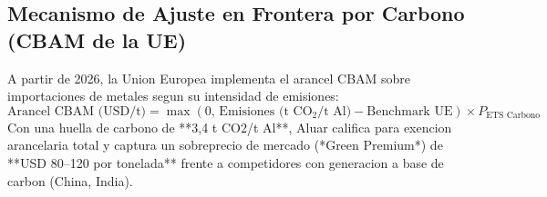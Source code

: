 \documentclass[10pt,a4paper]{article}
\theoremstyle{definition}
\begin{document}
\subsection{Mecanismo de Ajuste en Frontera por Carbono (CBAM de la UE)}
A partir de 2026, la Union Europea implementa el arancel CBAM sobre importaciones de metales segun su intensidad de emisiones:
\begin{equation}
\text{Arancel CBAM (USD/t)} = \max\left( 0, \, \text{Emisiones (t }\text{CO}_2\text{/t Al)} - \text{Benchmark UE} \right) \times P_{\text{ETS Carbono}}
\end{equation}
Con una huella de carbono de **3,4 t CO2/t Al**, Aluar califica para exencion arancelaria total y captura un sobreprecio de mercado (*Green Premium*) de **USD 80--120 por tonelada** frente a competidores con generacion a base de carbon (China, India).
\end{document}
